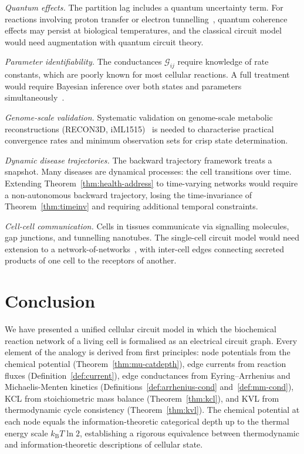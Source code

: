\documentclass[twocolumn,10pt,a4paper]{article}
\newcommand{\kB}{k_{\mathrm{B}}}
\newcommand{\Gcond}{\mathcal{G}}
\begin{document}
\emph{Quantum effects.}
The partition lag includes a quantum uncertainty term.  For reactions involving
proton transfer or electron tunnelling~\cite{Marcus1956}, quantum coherence
effects may persist at biological temperatures, and the classical circuit model
would need augmentation with quantum circuit theory.

\emph{Parameter identifiability.}
The conductances $\Gcond_{ij}$ require knowledge of rate constants, which are
poorly known for most cellular reactions.  A full treatment would require
Bayesian inference over both states and parameters simultaneously~\cite{Pearl1988}.

\emph{Genome-scale validation.}
Systematic validation on genome-scale metabolic reconstructions (RECON3D,
iML1515)~\cite{Palsson2015} is needed to characterise practical convergence
rates and minimum observation sets for crisp state determination.

\emph{Dynamic disease trajectories.}
The backward trajectory framework treats a snapshot.  Many diseases are
dynamical processes: the cell transitions over time.  Extending
Theorem~\ref{thm:health-address} to time-varying networks would require a
non-autonomous backward trajectory, losing the time-invariance of
Theorem~\ref{thm:timeinv} and requiring additional temporal constraints.

\emph{Cell-cell communication.}
Cells in tissues communicate via signalling molecules, gap junctions, and
tunnelling nanotubes.  The single-cell circuit model would need extension to a
network-of-networks~\cite{BarabasiOltvai2004}, with inter-cell edges connecting
secreted products of one cell to the receptors of another.

\section{Conclusion}
\label{sec:conclusion}

We have presented a unified cellular circuit model in which the biochemical
reaction network of a living cell is formalised as an electrical circuit graph.
Every element of the analogy is derived from first principles: node potentials
from the chemical potential (Theorem~\ref{thm:mu-catdepth}), edge currents from
reaction fluxes (Definition~\ref{def:current}), edge conductances from
Eyring--Arrhenius and Michaelis-Menten kinetics
(Definitions~\ref{def:arrhenius-cond} and~\ref{def:mm-cond}), KCL from
stoichiometric mass balance (Theorem~\ref{thm:kcl}), and KVL from
thermodynamic cycle consistency (Theorem~\ref{thm:kvl}).  The chemical potential
at each node equals the information-theoretic categorical depth up to the
thermal energy scale $\kB T\ln 2$, establishing a rigorous equivalence between
thermodynamic and information-theoretic descriptions of cellular state.
\end{document}

